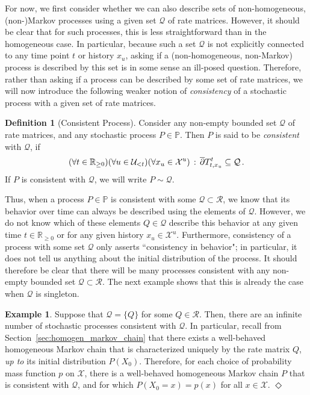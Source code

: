 \documentclass[10pt]{paper}
\theoremstyle{definition}
\newtheorem{exmp}{Example}%
\newtheorem{definition}{Definition}
\newcommand{\reals}{\mathbb{R}}
\newcommand{\realsnonneg}{\reals_{\geq 0}}
\newcommand{\states}{\mathcal{X}}
\newcommand{\processes}{\mathbb{P}}
\newcommand{\rateset}{\mathcal{Q}}
\newcommand{\exampleend}{\hfill$\Diamond$}
\begin{document}
For now, we first consider whether we can also describe sets of non-homogeneous, (non-)Markov processes using a given set $\rateset$ of rate matrices. However, it should be clear that for such processes, this is less straightforward than in the homogeneous case. In particular, because such a set $\rateset$ is not explicitly connected to any time point $t$ or history $x_u$, asking if a (non-homogeneous, non-Markov) process is described by this set is in some sense an ill-posed question.
Therefore, rather than asking if a process can be described by some set of rate matrices, we will now introduce the following weaker notion of \emph{consistency} of a stochastic process with a given set of rate matrices.

\begin{definition}[Consistent Process]
Consider any non-empty bounded set $\rateset$ of rate matrices, and any stochastic process $P\in\processes$. Then $P$ is said to be \emph{consistent} with $\rateset$, if
\begin{equation*}
(\forall t\in\realsnonneg)(\forall u\in\mathcal{U}_{<t})(\forall x_u\in\states^u)\,:\, \smash{\overline{\partial}}T_{t,x_u}^t \subseteq \rateset\,.
\end{equation*}
If $P$ is consistent with $\rateset$, we will write $P\sim\rateset$.
\end{definition}

Thus, when a process $P\in\processes$ is consistent with some $\rateset\subset\mathcal{R}$, we know that its behavior over time can always be described using the elements of $\rateset$. However, we do not know which of these elements $Q\in\rateset$ describe this behavior at any given time  $t\in\realsnonneg$ or for any given history $x_u\in\states^u$. Furthermore, consistency of a process with some set $\rateset$ only asserts ``consistency in behavior"; in particular, it does not tell us anything about the initial distribution of the process. It should therefore be clear that there will be many processes consistent with any non-empty bounded set $\rateset\subset\mathcal{R}$. The next example shows that this is already the case when $\rateset$ is singleton.

\begin{exmp}\label{example:singleton_infinite_consistent}
Suppose that $\rateset=\{Q\}$ for some $Q\in\mathcal{R}$. Then, there are an infinite number of stochastic processes consistent with $\rateset$. In particular, recall from Section~\ref{sec:homogen_markov_chain} that there exists a well-behaved homogeneous Markov chain that is characterized uniquely by the rate matrix $Q$, \emph{up to} its initial distribution $P(X_0)$. Therefore, for each choice of probability mass function $p$ on $\states$, there is a well-behaved homogeneous Markov chain $P$ that is consistent with $\rateset$, and for which $P(X_0=x)=p(x)$ for all $x\in\states$.
\exampleend
\end{exmp}
\end{document}
